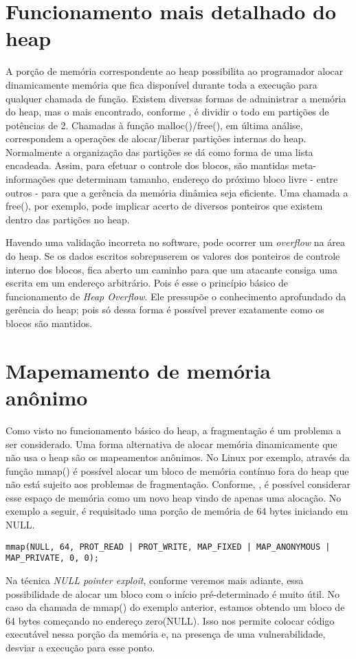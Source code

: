 	\section{Funcionamento mais detalhado do heap}
	\label{sec:funcionamento_heap}
	A porção de memória correspondente ao heap possibilita ao programador alocar dinamicamente memória
	que fica disponível durante toda a execução para qualquer chamada de função.
	Existem diversas formas de administrar a memória do heap, mas o mais encontrado, conforme
	\cite{Love2007}, é dividir o todo em partições de potências de 2. Chamadas à função malloc()/free(),
	em última análise, correspondem a operações de alocar/liberar partições internas do heap.
	Normalmente a organização das partições se dá como forma de uma lista encadeada.
	Assim, para efetuar o controle dos blocos, são mantidas meta-informações que determinam
	tamanho, endereço do próximo bloco livre - entre outros - para que a gerência
	da memória dinâmica seja eficiente.
	Uma chamada a free(), por exemplo, pode implicar acerto de diversos ponteiros que existem
	dentro das partições no heap.
	 

	Havendo uma validação incorreta no software, pode ocorrer um \textsl{overflow} na área do
	heap. Se os dados escritos sobrepuserem os valores dos ponteiros de controle interno dos blocos,
	fica aberto um caminho para que um atacante consiga uma escrita em um endereço arbitrário.
	Pois é esse o princípio básico de funcionamento de \textsl{Heap Overflow}. Ele pressupõe
	o conhecimento aprofundado da gerência do heap; pois só dessa forma é possível prever
	exatamente como os blocos são mantidos.

	\section{Mapemamento de memória anônimo}
	Como visto no funcionamento básico do heap, a fragmentação é um problema a ser considerado.
	Uma forma alternativa de alocar memória dinamicamente que não usa o heap são os mapeamentos anônimos.
	No Linux por exemplo, através da função mmap() é possível alocar um bloco de memória contínuo
	fora do heap que não está sujeito aos problemas de fragmentação.
	Conforme, \cite{Love2007}, é possível considerar esse espaço de memória como um novo heap
	vindo de apenas uma alocação.
	No exemplo a seguir, é requisitado uma porção de memória de 64 bytes iniciando em NULL.
	\begin{lstlisting}[label=mmap_example,caption=Mapeamento de memória anônimo.]
		mmap(NULL, 64, PROT_READ | PROT_WRITE, MAP_FIXED | MAP_ANONYMOUS | MAP_PRIVATE, 0, 0);
	\end{lstlisting}
	Na técnica \textsl{NULL pointer exploit}, conforme veremos mais adiante, essa possibilidade
	de alocar um bloco com o início pré-determinado é muito útil.
	No caso da chamada de mmap() do exemplo anterior, estamos obtendo um bloco de 64 bytes começando
	no endereço zero(NULL). Isso nos permite colocar código executável nessa porção da memória e,
	na presença de uma vulnerabilidade, desviar a execução para esse ponto.
	
